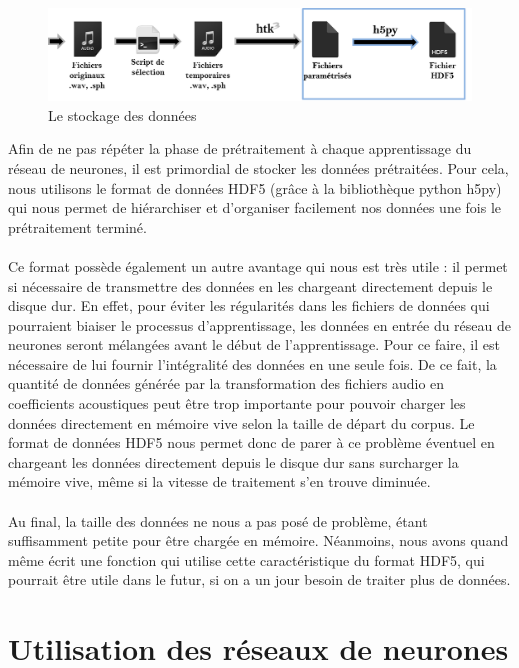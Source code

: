 \documentclass{article}
\begin{document}
\hphantom{.}
\begin{figure}[h]
  \centerline{\includegraphics[scale=0.8]{img/schema_stockage.png}}
  \caption{Le stockage des données}
\end{figure}

Afin de ne pas répéter la phase de prétraitement à chaque apprentissage du réseau de neurones, il est primordial de stocker les données prétraitées. Pour cela, nous utilisons le format de données HDF5\cite{docHDF5} (grâce à la bibliothèque python h5py\cite{docH5py}) qui nous permet de hiérarchiser et d'organiser facilement nos données une fois le prétraitement terminé.\\
 \\
 Ce format possède également un autre avantage qui nous est très utile : il permet si nécessaire de transmettre des données en les chargeant directement depuis le disque dur. En effet, pour éviter les régularités dans les fichiers de données qui pourraient biaiser le processus d'apprentissage, les données en entrée du réseau de neurones seront mélangées avant le début de l'apprentissage. Pour ce faire, il est nécessaire de lui fournir l'intégralité des données en une seule fois. De ce fait, la quantité de données générée par la transformation des fichiers audio en coefficients acoustiques peut être trop importante pour pouvoir charger les données directement en mémoire vive selon la taille de départ du corpus. Le format de données HDF5 nous permet donc de parer à ce problème éventuel en chargeant les données directement depuis le disque dur sans surcharger la mémoire vive, même si la vitesse de traitement s'en trouve diminuée.\\
 \\
Au final, la taille des données ne nous a pas posé de problème, étant suffisamment petite pour être chargée en mémoire. Néanmoins, nous avons quand même écrit une fonction qui utilise cette caractéristique du format HDF5, qui pourrait être utile dans le futur, si on a un jour besoin de traiter plus de données.
\newpage
\section{Utilisation des réseaux de neurones}
\end{document}
